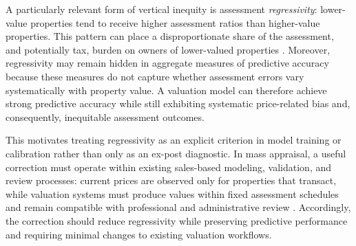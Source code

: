 \documentclass[10pt]{article}
\theoremstyle{definition}
\newcommand{\1}{\mathbf{1}}
\begin{document}
{A particularly relevant form of vertical inequity is} assessment \emph{regressivity}: lower-value properties tend to receive higher assessment ratios than higher-value properties. This pattern can place a disproportionate share of the assessment, and potentially tax, burden on owners of lower-valued properties \cite{McMillen2020,Berry2021,AvenancioLeonHoward2022}. Moreover, regressivity may remain hidden in aggregate measures of predictive accuracy because these measures do not capture whether assessment errors vary systematically with property value. A valuation model can therefore achieve strong predictive accuracy while still exhibiting systematic price-related bias and, consequently, inequitable assessment outcomes.


{This motivates treating regressivity as an explicit criterion in model training or calibration rather than only as an ex-post diagnostic. In mass appraisal, a useful correction must operate within existing sales-based modeling, validation, and review processes: current prices are observed only for properties that transact, while valuation systems must produce values within fixed assessment schedules and remain compatible with professional and administrative review \cite{IAAO2020SalesVerification,IAAO2018AVM,IAAO2025Mass}. Accordingly, the correction should reduce regressivity while preserving predictive performance and requiring minimal changes to existing valuation workflows.}
\end{document}
